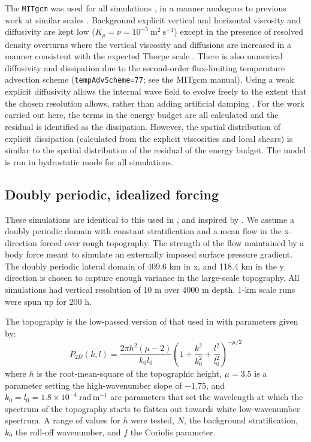 \documentclass[twocol]{ametsocV5}
\begin{document}
The \verb+MITgcm+ was used for all simulations \citep{marshalletal97}, in a manner analogous to previous work at similar scales \citep{buijsmanetal14,klymaketal16b, klymak18}.  Background explicit vertical and horizontal viscosity and diffusivity are kept low ($K_{\rho} = \nu = 10^{-5}\ \mathrm{m^2\ s^{-1}}$) except in the presence of resolved density overturns where the vertical viscosity and diffusions are increased in a manner consistent with the expected Thorpe scale \citep{klymaklegg10}.  There is also numerical diffusivity and dissipation due to the second-order flux-limiting temperature advection scheme (\verb+tempAdvScheme=77+; see the MITgcm manual).  Using a weak explicit diffusivity allows the internal wave field to evolve freely to the extent that the chosen resolution allows, rather than adding artificial damping \citep{ShakespeareHogg17}.  For the work carried out here, the terms in the energy budget are all calculated and the residual is identified as the dissipation.  However, the spatial distribution of explicit dissipation (calculated from the explicit viscosities and local shears) is similar to the spatial distribution of the residual of the energy budget.  The model is run in hydrostatic mode for all simulations.  

\subsection{Doubly periodic, idealized forcing}

These simulations are identical to this used in \citet{klymak18}, and inspired by \citet{nikurashinferrari14}.  We assume a doubly periodic domain with constant stratification and a mean flow in the x-direction forced over rough topography.  The strength of the flow maintained by a body force meant to simulate an externally imposed surface pressure gradient.  The doubly periodic lateral domain of 409.6 km in x, and 118.4 km in the y direction is chosen to capture enough variance in the large-scale topography. All simulations had vertical resolution of 10 m over 4000 m depth.  1-km scale runs were spun up for 200 h.

The topography is the low-passed version of that used in \cite{klymak18} with parameters given by: 
\begin{equation}
    P_{2D}(k,l) = \frac{2\pi h^2 \left(\mu-2 \right)}{k_0l_0}\left( 1 + \frac{k^2}{k_0^2} + \frac{l^2}{l_0^2}\right)^{-\mu/2}
    \label{eq:topo2d}
\end{equation}
where $h$ is the root-mean-square of the topographic height, $\mu=3.5$ is a parameter setting the high-wavenumber slope of $-1.75$, and $k_0=l_0 = 1.8\times10^{-4}\ \mathrm{rad\,m^{-1}}$ are parameters that set the wavelength at which the spectrum of the topography starts to flatten out towards white low-wavenumber spectrum.  A range of values for $h$ were tested, $N$, the background stratification, $k_0$ the roll-off wavenumber, and $f$ the Coriolis parameter.  
\end{document}
